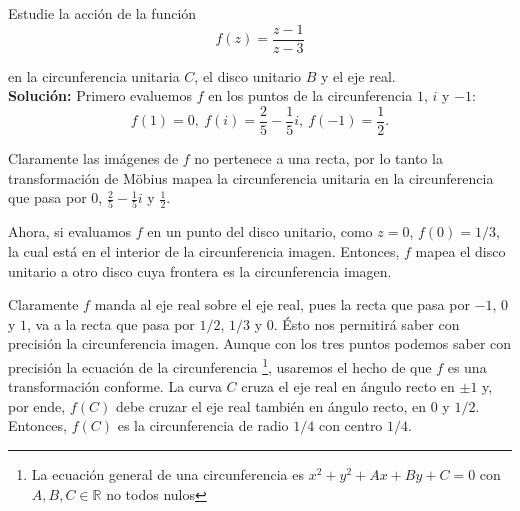 \begin{ejemplo}
Estudie la acción de la función
$$f(z) = \frac{z-1}{z-3}$$

en la circunferencia unitaria $C$, el disco unitario $B$ y el eje real.
\\

\textbf{Solución:} Primero evaluemos $f$ en los puntos de la circunferencia $1$, $i$ y $-1$:
$$f(1) = 0, ~ f(i) = \frac{2}{5}-\frac{1}{5}i, ~ f(-1) = \frac{1}{2}.$$

Claramente las imágenes de $f$ no pertenece a una recta, por lo tanto la transformación de Möbius mapea la circunferencia unitaria en la circunferencia que pasa por $0$, $\frac{2}{5}-\frac{1}{5}i$ y $\frac{1}{2}$. 

Ahora, si evaluamos $f$ en un punto del disco unitario, como $z = 0$, $f(0) = 1/3$, la cual está en el interior de la circunferencia imagen. Entonces, $f$ mapea el disco unitario a otro disco cuya frontera es la circunferencia imagen.

Claramente $f$ manda al eje real sobre el eje real, pues la recta que pasa por $-1$, $0$ y $1$, va a la recta que pasa por $1/2$, $1/3$ y $0$. Ésto nos permitirá saber con precisión la circunferencia imagen. Aunque con los tres puntos podemos saber con precisión la ecuación de la circunferencia \footnote{La ecuación general de una circunferencia es $x^2 + y^2 + Ax + By + C = 0$ con $A,B,C \in \mathbb{R}$ no todos nulos}, usaremos el hecho de que $f$ es una transformación conforme. La curva $C$ cruza el eje real en ángulo recto en $\pm 1$ y, por ende, $f(C)$ debe cruzar el eje real también en ángulo recto, en $0$ y $1/2$. Entonces, $f(C)$ es la circunferencia de radio $1/4$ con centro $1/4$.
\end{ejemplo}

\newpage

